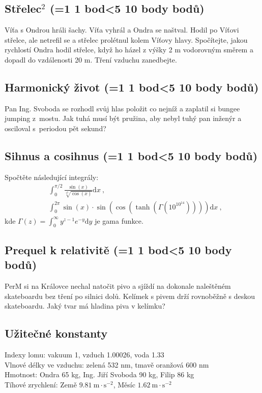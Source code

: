 \documentclass[10pt,a4paper,landscape,twocolumn]{article}
\newcounter{bodycounter}
\newcommand{\bodystring}[1]{\ifnum #1=1 1 bod\else\ifnum #1<5 #1 body\else #1 bodů\fi\fi}
\newcommand{\uloha}[3]{
\subsection{#1 (\bodystring{#2})}
#3\addtocounter{bodycounter}{#2}}
\begin{document}
\uloha{Střelec$^2$}{10}{
Víťa s Ondrou hráli šachy. Víťa vyhrál a Ondra se naštval. Hodil po Víťovi střelce, ale netrefil se a střelec prolétnul kolem Víťovy hlavy. Spočítejte, jakou rychlostí Ondra hodil střelce, když ho házel z výšky 2 m vodorovným směrem a dopadl do vzdálenosti 20 m. Tření vzduchu zanedbejte.
}

\uloha{Harmonický život}{10}{
Pan Ing. Svoboda se rozhodl svůj hlas položit co nejníž a zaplatil si bungee jumping z~mostu. Jak tuhá musí být pružina, aby nebyl tuhý pan inženýr a osciloval s~periodou pět sekund?
}

\uloha{Sihnus a cosihnus}{10}{
Spočtěte následující integrály:
\begin{subequations}
\begin{align}
&\int_0^{\pi/2} \frac{\sin\left(x\right)}{\sqrt[17]{\cos\left(x\right)}}\mathrm{d} x ~,\\
&\int_0^{2\pi} \sin\left(x\right)\cdot\sin\left(\cos\left(\tanh\left(\Gamma\left(10^{10^{14}}\right)\right)\right)\right)\mathrm{d} x ~,
\end{align}
\end{subequations}
kde $\Gamma\left(z\right) = \int_0^\infty y^{z-1}e^{-y}\mathrm{d}y$ je gama funkce.
}

\uloha{Prequel k relativitě}{10}{
PerM si na Královce nechal natočit pivo a sjíždí na dokonale naleštěném skateboardu bez tření po silnici dolů. Kelímek s pivem drží rovnoběžně s deskou skateboardu. Jaký tvar má hladina piva v kelímku?
}


\subsection*{Užitečné konstanty}
Indexy lomu: vakuum 1, vzduch 1.00026, voda 1.33 \\
Vlnové délky ve vzduchu: zelená 532 nm, tmavě oranžová 600 nm\\
Hmotnost: Ondra 65 kg, Ing. Jiří Svoboda 90 kg, Filip 86 kg\\
Tíhové zrychlení: Země $9.81~\mathrm{m\cdot s^{-2}}$, Měsíc $1.62~\mathrm{m\cdot s^{-2}}$

\end{document}
